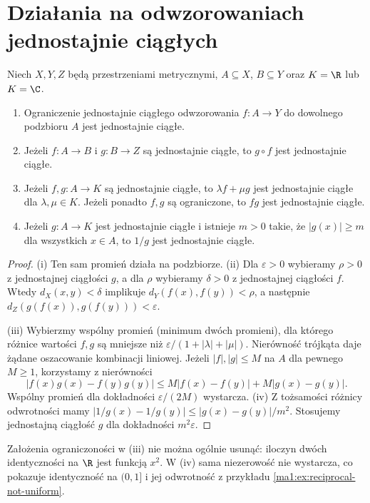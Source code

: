 \section{Działania na odwzorowaniach jednostajnie ciągłych}
\begin{twierdzenie}
\label{ma1:thm:uniform-operations}
Niech $X,Y,Z$ będą przestrzeniami metrycznymi, $A\subseteq X$, $B\subseteq Y$ oraz $K=\R$ lub $K=\C$.
\begin{enumerate}[label=(\roman*)]
\item Ograniczenie jednostajnie ciągłego odwzorowania $f:A\to Y$ do dowolnego podzbioru $A$ jest jednostajnie ciągłe.
\item Jeżeli $f:A\to B$ i $g:B\to Z$ są jednostajnie ciągłe, to $g\circ f$ jest jednostajnie ciągłe.
\item Jeżeli $f,g:A\to K$ są jednostajnie ciągłe, to $\lambda f+\mu g$ jest jednostajnie ciągłe dla $\lambda,\mu\in K$. Jeżeli ponadto $f,g$ są ograniczone, to $fg$ jest jednostajnie ciągłe.
\item Jeżeli $g:A\to K$ jest jednostajnie ciągłe i istnieje $m>0$ takie, że $|g(x)|\ge m$ dla wszystkich $x\in A$, to $1/g$ jest jednostajnie ciągłe.
\end{enumerate}
\end{twierdzenie}
\begin{proof}
(i) Ten sam promień działa na podzbiorze. (ii) Dla $\varepsilon>0$ wybieramy $\rho>0$ z jednostajnej ciągłości $g$, a dla $\rho$ wybieramy $\delta>0$ z jednostajnej ciągłości $f$. Wtedy $d_X(x,y)<\delta$ implikuje $d_Y(f(x),f(y))<\rho$, a następnie $d_Z(g(f(x)),g(f(y)))<\varepsilon$.

(iii) Wybierzmy wspólny promień (minimum dwóch promieni), dla którego różnice wartości $f,g$ są mniejsze niż $\varepsilon/(1+|\lambda|+|\mu|)$. Nierówność trójkąta daje żądane oszacowanie kombinacji liniowej. Jeżeli $|f|,|g|\le M$ na $A$ dla pewnego $M\ge1$, korzystamy z nierówności
\[
 |f(x)g(x)-f(y)g(y)|\le M|f(x)-f(y)|+M|g(x)-g(y)|.
\]
Wspólny promień dla dokładności $\varepsilon/(2M)$ wystarcza.
(iv) Z tożsamości różnicy odwrotności mamy
$|1/g(x)-1/g(y)|\le |g(x)-g(y)|/m^2$. Stosujemy jednostajną ciągłość $g$ dla dokładności $m^2\varepsilon$.
\end{proof}
Założenia ograniczoności w (iii) nie można ogólnie usunąć: iloczyn dwóch identyczności na $\R$ jest funkcją $x^2$. W (iv) sama niezerowość nie wystarcza, co pokazuje identyczność na $(0,1]$ i jej odwrotność z przykładu \ref{ma1:ex:reciprocal-not-uniform}.

